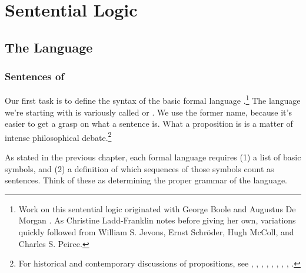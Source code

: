 
\chapter{Sentential Logic}\label{sententiallogic}


\section{The Language \GSL{}}\label{The Language GSL}

\subsection{Sentences of \GSL{}}\label{Sentences of GSL}
Our first task is to define the syntax of the basic formal language \GSL{}.\footnote{Work on this sentential logic originated with George Boole \citeyearpar{Boole1854} and Augustus De Morgan \citeyearpar{DeMorgan1847,DeMorgan1860}. 
	As Christine Ladd-Franklin notes \citeyearpar[17]{LaddFranklin1883} before giving her own, variations quickly followed from William S. Jevons, Ernst Schr\"oder, Hugh McColl, and Charles S. Peirce.} 
The language we're starting with is variously called  or . 
We use the former name, because it's easier to get a grasp on what a sentence is. What a proposition is is a matter of intense philosophical debate.\footnote{For historical and contemporary discussions of propositions, see \citealt{Frege1892}, \citealt[13,47]{Russell1903}, \citealt[26]{Church1956}, \citealt[ch.~1]{Quine1986}, \citealt[ch.~3]{Schiffer1987}, \citealt{Grandy1993}, \citealt{Bealer1998b}, \citealp{King2007}, \citealt{Soames2010}.}

As stated in the previous chapter, each formal language requires (1) a list of basic symbols, and (2) a definition of which sequences of those symbols count as sentences. Think of these as determining the proper grammar of the language. 

